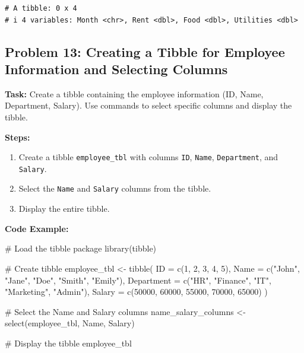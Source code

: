 \documentclass[
  letterpaper,
  DIV=11,
  numbers=noendperiod]{scrreprt}
\newenvironment{Shaded}{\begin{snugshade}}{\end{snugshade}}
\newcommand{\AttributeTok}[1]{\textcolor[rgb]{0.40,0.45,0.13}{#1}}
\newcommand{\CommentTok}[1]{\textcolor[rgb]{0.37,0.37,0.37}{#1}}
\newcommand{\DecValTok}[1]{\textcolor[rgb]{0.68,0.00,0.00}{#1}}
\newcommand{\FunctionTok}[1]{\textcolor[rgb]{0.28,0.35,0.67}{#1}}
\newcommand{\NormalTok}[1]{\textcolor[rgb]{0.00,0.23,0.31}{#1}}
\newcommand{\OtherTok}[1]{\textcolor[rgb]{0.00,0.23,0.31}{#1}}
\newcommand{\StringTok}[1]{\textcolor[rgb]{0.13,0.47,0.30}{#1}}
\providecommand{\tightlist}{%
  \setlength{\itemsep}{0pt}\setlength{\parskip}{0pt}}\usepackage{longtable,booktabs,array}
\begin{document}
\begin{verbatim}
# A tibble: 0 x 4
# i 4 variables: Month <chr>, Rent <dbl>, Food <dbl>, Utilities <dbl>
\end{verbatim}

\subsection*{Problem 13: Creating a Tibble for Employee Information and
Selecting
Columns}\label{problem-13-creating-a-tibble-for-employee-information-and-selecting-columns}

\textbf{Task:} Create a tibble containing the employee information (ID,
Name, Department, Salary). Use commands to select specific columns and
display the tibble.

\textbf{Steps:}

\begin{enumerate}
\def\labelenumi{\arabic{enumi}.}
\tightlist
\item
  Create a tibble \texttt{employee\_tbl} with columns \texttt{ID},
  \texttt{Name}, \texttt{Department}, and \texttt{Salary}.
\item
  Select the \texttt{Name} and \texttt{Salary} columns from the tibble.
\item
  Display the entire tibble.
\end{enumerate}

\textbf{Code Example:}

\begin{Shaded}
\begin{Highlighting}[]
\CommentTok{\# Load the tibble package}
\FunctionTok{library}\NormalTok{(tibble)}

\CommentTok{\# Create tibble}
\NormalTok{employee\_tbl }\OtherTok{\textless{}{-}} \FunctionTok{tibble}\NormalTok{(}
  \AttributeTok{ID =} \FunctionTok{c}\NormalTok{(}\DecValTok{1}\NormalTok{, }\DecValTok{2}\NormalTok{, }\DecValTok{3}\NormalTok{, }\DecValTok{4}\NormalTok{, }\DecValTok{5}\NormalTok{),}
  \AttributeTok{Name =} \FunctionTok{c}\NormalTok{(}\StringTok{"John"}\NormalTok{, }\StringTok{"Jane"}\NormalTok{, }\StringTok{"Doe"}\NormalTok{, }\StringTok{"Smith"}\NormalTok{, }\StringTok{"Emily"}\NormalTok{),}
  \AttributeTok{Department =} \FunctionTok{c}\NormalTok{(}\StringTok{"HR"}\NormalTok{, }\StringTok{"Finance"}\NormalTok{, }\StringTok{"IT"}\NormalTok{, }\StringTok{"Marketing"}\NormalTok{, }\StringTok{"Admin"}\NormalTok{),}
  \AttributeTok{Salary =} \FunctionTok{c}\NormalTok{(}\DecValTok{50000}\NormalTok{, }\DecValTok{60000}\NormalTok{, }\DecValTok{55000}\NormalTok{, }\DecValTok{70000}\NormalTok{, }\DecValTok{65000}\NormalTok{)}
\NormalTok{)}

\CommentTok{\# Select the Name and Salary columns}
\NormalTok{name\_salary\_columns }\OtherTok{\textless{}{-}} \FunctionTok{select}\NormalTok{(employee\_tbl, Name, Salary)}

\CommentTok{\# Display the tibble}
\NormalTok{employee\_tbl}
\end{Highlighting}
\end{Shaded}
\end{document}
